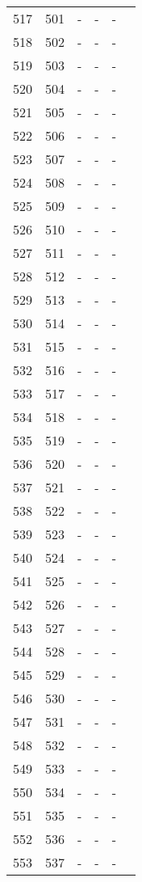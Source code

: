 \begin{longtable}{rrrrrr}
  517 & 501 & - & - & - &  \\ 
  518 & 502 & - & - & - &  \\ 
  519 & 503 & - & - & - &  \\ 
  520 & 504 & - & - & - &  \\ 
  521 & 505 & - & - & - &  \\ 
  522 & 506 & - & - & - &  \\ 
  523 & 507 & - & - & - &  \\ 
  524 & 508 & - & - & - &  \\ 
  525 & 509 & - & - & - &  \\ 
  526 & 510 & - & - & - &  \\ 
  527 & 511 & - & - & - &  \\ 
  528 & 512 & - & - & - &  \\ 
  529 & 513 & - & - & - &  \\ 
  530 & 514 & - & - & - &  \\ 
  531 & 515 & - & - & - &  \\ 
  532 & 516 & - & - & - &  \\ 
  533 & 517 & - & - & - &  \\ 
  534 & 518 & - & - & - &  \\ 
  535 & 519 & - & - & - &  \\ 
  536 & 520 & - & - & - &  \\ 
  537 & 521 & - & - & - &  \\ 
  538 & 522 & - & - & - &  \\ 
  539 & 523 & - & - & - &  \\ 
  540 & 524 & - & - & - &  \\ 
  541 & 525 & - & - & - &  \\ 
  542 & 526 & - & - & - &  \\ 
  543 & 527 & - & - & - &  \\ 
  544 & 528 & - & - & - &  \\ 
  545 & 529 & - & - & - &  \\ 
  546 & 530 & - & - & - &  \\ 
  547 & 531 & - & - & - &  \\ 
  548 & 532 & - & - & - &  \\ 
  549 & 533 & - & - & - &  \\ 
  550 & 534 & - & - & - &  \\ 
  551 & 535 & - & - & - &  \\ 
  552 & 536 & - & - & - &  \\ 
  553 & 537 & - & - & - &  \\ 

\end{longtable}

